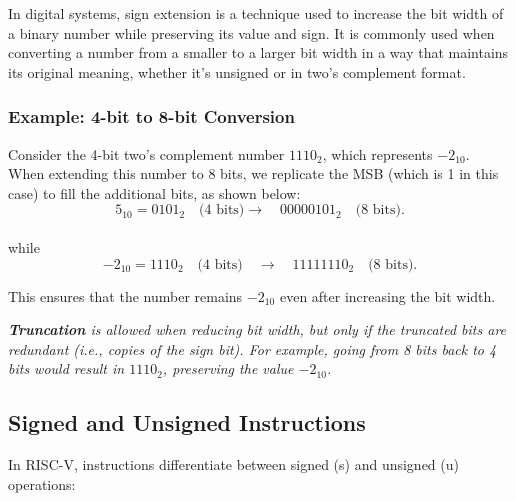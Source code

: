In digital systems, sign extension is a technique used to increase the bit width of a binary number while preserving its value and sign. It is commonly used when converting a number from a smaller to a larger bit width in a way that maintains its original meaning, whether it's unsigned or in two’s complement format.


\subsubsection{Example: 4-bit to 8-bit Conversion}
Consider the 4-bit two’s complement number \( 1110_2 \), which represents \( -2_{10} \).\\
When extending this number to 8 bits, we replicate the MSB (which is 1 in this case) to fill the additional bits, as shown below: \\
\[
5_{10} = 0101_2 \quad \text{(4 bits)} \to \quad 00000101_2 \quad \text{(8 bits)}.
\] \\
while 
\[
-2_{10} = 1110_2 \quad \text{(4 bits)} \quad \to \quad 11111110_2 \quad \text{(8 bits)}.
\]

This ensures that the number remains \( -2_{10} \) even after increasing the bit width. \\
\vspace*{5px}


\textit{\textbf{Truncation} is allowed when reducing bit width, but only if the truncated bits are redundant (i.e., copies of the sign bit). For example, going from 8 bits back to 4 bits would result in \( 1110_2 \), preserving the value \( -2_{10} \).
}

\subsection{Signed and Unsigned Instructions}
In RISC-V, instructions differentiate between signed (s) and unsigned (u) operations:


